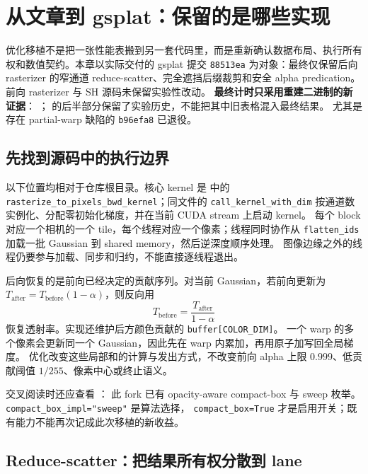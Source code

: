 \section{从文章到 gsplat：保留的是哪些实现}
\label{sec:gsplat-evaluation}

优化移植不是把一张性能表搬到另一套代码里，而是重新确认数据布局、执行所有权和数值契约。本章以实际交付的 gsplat 提交
\texttt{88513ea} 为对象：最终仅保留后向 rasterizer 的窄通道
reduce-scatter、完全遮挡后缀裁剪和安全 alpha predication。
前向 rasterizer 与 SH 源码未保留实验性改动。
\textbf{最终计时只采用重建二进制的新证据}：
；
 的后半部分保留了实验历史，不能把其中旧表格混入最终结果。
尤其是存在 partial-warp 缺陷的 \texttt{b96efa8} 已退役。

\subsection{先找到源码中的执行边界}

以下位置均相对于仓库根目录。核心 kernel 是
中的 \texttt{rasterize\_to\_pixels\_bwd\_kernel}；同文件的
\texttt{call\_kernel\_with\_dim} 按通道数实例化、分配零初始化梯度，并在当前 CUDA stream 上启动 kernel。
每个 block 对应一个相机的一个 tile，每个线程对应一个像素；线程同时协作从
\texttt{flatten\_ids} 加载一批 Gaussian 到 shared memory，然后逆深度顺序处理。
图像边缘之外的线程仍要参与加载、同步和归约，不能直接逐线程退出。

后向恢复的是前向已经决定的贡献序列。对当前 Gaussian，若前向更新为
\(T_{\mathrm{after}}=T_{\mathrm{before}}(1-\alpha)\)，则反向用
\[
 T_{\mathrm{before}}=\frac{T_{\mathrm{after}}}{1-\alpha}
\]
恢复透射率。实现还维护后方颜色贡献的 \texttt{buffer[COLOR\_DIM]}。
一个 warp 的多个像素会更新同一个 Gaussian，因此先在 warp 内累加，再用原子加写回全局梯度。
优化改变这些局部和的计算与发出方式，不改变前向 alpha 上限
\(0.999\)、低贡献阈值 \(1/255\)、像素中心或终止语义。

交叉阅读时还应查看
：
此 fork 已有 opacity-aware compact-box 与 sweep 枚举。
\texttt{compact\_box\_impl="sweep"} 是算法选择，
\texttt{compact\_box=True} 才是启用开关；既有能力不能再次记成此次移植的新收益。

\subsection{Reduce-scatter：把结果所有权分散到 lane}

